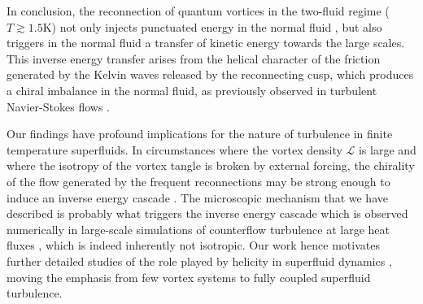 \documentclass[%
 reprint,
 amsmath,amssymb,
 aps,
 prl,
]{revtex4-2}
\begin{document}
{%
In conclusion, the reconnection of quantum vortices in the two-fluid regime
($T\gtrsim 1.5$K) not only injects punctuated
energy in the normal fluid \cite{stasiak2024quantum}, but also triggers in the normal fluid
a transfer of kinetic energy towards the large scales. 
This inverse energy transfer arises from the helical character of the
friction generated by the Kelvin waves released by the reconnecting
cusp, which produces a chiral imbalance in the normal fluid, as 
previously observed in turbulent Navier-Stokes flows
\cite{biferaleInverseEnergyCascade2012a,plunianInverseCascadeEnergy2020a}.

Our findings have profound implications for the nature of turbulence in 
finite temperature superfluids. In circumstances where the vortex density 
$\mathcal{L}$ is large and where the isotropy of the vortex tangle 
is broken by external forcing, the chirality of the flow generated by the 
frequent reconnections may be strong enough to induce an inverse energy 
cascade \cite{notes_recon}.
The microscopic mechanism that we have described is probably what
triggers the inverse energy cascade which is observed numerically in  
large-scale simulations of counterflow turbulence at large heat fluxes \cite{polanco2020}, which is
indeed inherently not isotropic.
Our work hence motivates further detailed studies of
the role played by helicity in superfluid dynamics 
\cite{dileoni2016,galantucci2021},
moving the emphasis from few vortex systems \cite{scheeler2014} 
to fully coupled superfluid turbulence.
 




}
\end{document}
